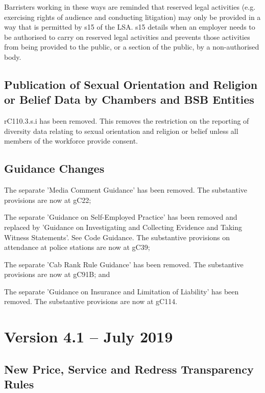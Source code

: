 Barristers working in these ways are reminded that reserved legal activities (e.g. exercising rights of audience and conducting litigation) may only be provided in a way that is permitted by s15 of the LSA. s15 details when an employer needs to be authorised to carry on reserved legal activities and prevents those activities from being provided to the public, or a section of the public, by a non-authorised body.

\subsection*{Publication of Sexual Orientation and Religion or Belief Data by Chambers and BSB Entities}

rC110.3.s.i has been removed. This removes the restriction on the reporting of diversity data relating to sexual orientation and religion or belief unless all members of the workforce provide consent.

\subsection*{Guidance Changes}
\begin{dotlist}
\item The separate 'Media Comment Guidance' has been removed. The substantive provisions are now at gC22;

\item The separate 'Guidance on Self-Employed Practice' has been removed and replaced by 'Guidance on Investigating and Collecting Evidence and Taking Witness Statements'. See Code Guidance. The substantive provisions on attendance at police stations are now at gC39;

\item The separate 'Cab Rank Rule Guidance' has been removed. The substantive provisions are now at gC91B; and

\item The separate 'Guidance on Insurance and Limitation of Liability' has been removed. The substantive provisions are now at gC114.\end{dotlist}
\section*{Version 4.1 – July 2019}
\subsection*{New Price, Service and Redress Transparency Rules}

